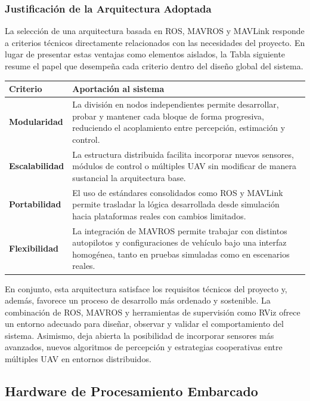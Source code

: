 \subsubsection{Justificación de la Arquitectura Adoptada}

La selección de una arquitectura basada en ROS, MAVROS y MAVLink responde a criterios técnicos directamente relacionados con las necesidades del proyecto. En lugar de presentar estas ventajas como elementos aislados, la Tabla siguiente resume el papel que desempeña cada criterio dentro del diseño global del sistema.

\vspace{0.2cm}

\begin{longtable}{>{\raggedright\arraybackslash}p{}>{\raggedright\arraybackslash}p{}}
\textbf{Criterio} & \textbf{Aportación al sistema} \\
\hline
\textbf{Modularidad} & La división en nodos independientes permite desarrollar, probar y mantener cada bloque de forma progresiva, reduciendo el acoplamiento entre percepción, estimación y control. \\
\textbf{Escalabilidad} & La estructura distribuida facilita incorporar nuevos sensores, módulos de control o múltiples UAV sin modificar de manera sustancial la arquitectura base. \\
\textbf{Portabilidad} & El uso de estándares consolidados como ROS y MAVLink permite trasladar la lógica desarrollada desde simulación hacia plataformas reales con cambios limitados. \\
\textbf{Flexibilidad} & La integración de MAVROS permite trabajar con distintos autopilotos y configuraciones de vehículo bajo una interfaz homogénea, tanto en pruebas simuladas como en escenarios reales. \\
\end{longtable}

En conjunto, esta arquitectura satisface los requisitos técnicos del proyecto y, además, favorece un proceso de desarrollo más ordenado y sostenible. La combinación de ROS, MAVROS y herramientas de supervisión como RViz ofrece un entorno adecuado para diseñar, observar y validar el comportamiento del sistema. Asimismo, deja abierta la posibilidad de incorporar sensores más avanzados, nuevos algoritmos de percepción y estrategias cooperativas entre múltiples UAV en entornos distribuidos.



\subsection{Hardware de Procesamiento Embarcado}

